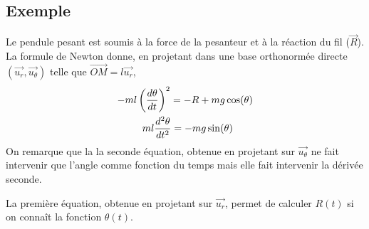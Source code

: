 \subsection{Exemple}
\begin{minipage}{.65\linewidth}
Le pendule pesant est soumis à la force de la pesanteur et à la réaction du fil ($\overrightarrow{R}$). La formule de Newton donne, en projetant dans une base orthonormée directe $(\overrightarrow{u_r}, \overrightarrow{u_\theta})$ telle que $\overrightarrow{OM} = l\overrightarrow{u_r}$,
\begin{align}
 -ml\left(\frac {d \theta}{d t}\right)^2 = -R + mg\cos(\theta)\hfill\\
  ml\frac {d^2 \theta}{d t^2} = -mg\sin(\theta)\qquad
 \end{align}
On remarque que la la seconde équation, obtenue en projetant sur $\overrightarrow{u_\theta}$ ne fait intervenir que l'angle comme fonction du temps mais elle fait intervenir la dérivée seconde.

La première équation, obtenue en projetant sur $\overrightarrow{u_r}$, permet de calculer $R(t)$ si on connaît la fonction $\theta(t)$.
\end{minipage} 
\hskip 5mm
\begin{minipage}[c]{.30\linewidth}
\begin{center}
\end{center}
\end{minipage}  
\newpage
